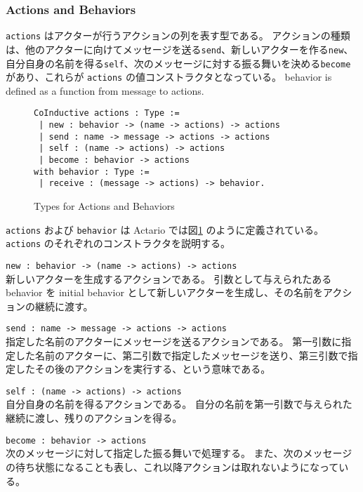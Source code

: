 \subsubsection{Actions and Behaviors}

\texttt{actions} はアクターが行うアクションの列を表す型である。
アクションの種類は、他のアクターに向けてメッセージを送る\texttt{send}、新しいアクターを作る\texttt{new}、自分自身の名前を得る\texttt{self}、次のメッセージに対する振る舞いを決める\texttt{become}があり、これらが \texttt{actions} の値コンストラクタとなっている。
behavior is defined as a function from message to actions.

\begin{figure}[tb]
\begin{lstlisting}
CoInductive actions : Type :=
 | new : behavior -> (name -> actions) -> actions
 | send : name -> message -> actions -> actions
 | self : (name -> actions) -> actions
 | become : behavior -> actions
with behavior : Type :=
 | receive : (message -> actions) -> behavior.
\end{lstlisting}
\caption{Types for Actions and Behaviors}\label{coq:actions}
\end{figure}

\texttt{actions} および \texttt{behavior} は Actario では図\ref{coq:actions} のように定義されている。
\texttt{actions} のそれぞれのコンストラクタを説明する。

\begin{list}{}{%
    \setlength{\leftmargin}{1.5em}
    \setlength{\itemindent}{-1.5em}
}
\item \lstinline|new : behavior -> (name -> actions) -> actions|\\
  新しいアクターを生成するアクションである。
  引数として与えられたある behavior を initial behavior として新しいアクターを生成し、その名前をアクションの継続に渡す。
\item \lstinline|send : name -> message -> actions -> actions|\\
  指定した名前のアクターにメッセージを送るアクションである。
  第一引数に指定した名前のアクターに、第二引数で指定したメッセージを送り、第三引数で指定したその後のアクションを実行する、という意味である。
\item \lstinline|self : (name -> actions) -> actions| \\
  自分自身の名前を得るアクションである。
  自分の名前を第一引数で与えられた継続に渡し、残りのアクションを得る。
\item \lstinline|become : behavior -> actions| \\
  次のメッセージに対して指定した振る舞いで処理する。
  また、次のメッセージの待ち状態になることも表し、これ以降アクションは取れないようになっている。
\end{list}

